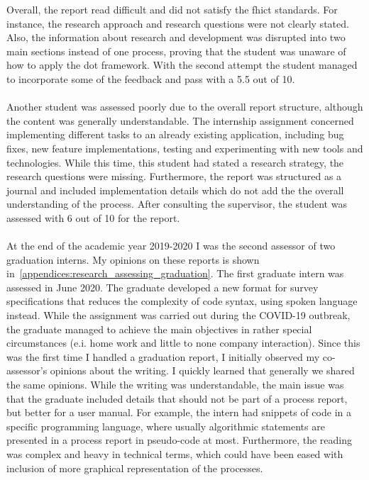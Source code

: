 Overall, the report read difficult and did not satisfy the \acrshort{fhict} standards. 
For instance, the research approach and research questions were not clearly stated. 
Also, the information about research and development was disrupted into two main sections instead of one process, proving that the student was unaware of how to apply the \acrshort{dot} framework. 
With the second attempt the student managed to incorporate some of the feedback and pass with a 5.5 out of 10. 
\\\\
Another student was assessed poorly due to the overall report structure, although the content was generally understandable.
The internship assignment concerned implementing different tasks to an already existing application, including bug fixes, new feature implementations, testing and experimenting with new tools and technologies.
While this time, this student had stated a research strategy, the research questions were missing. 
Furthermore, the report was structured as a journal and included implementation details which do not add the the overall understanding of the process. 
After consulting the supervisor, the student was assessed with 6 out of 10 for the report.
\\\\
At the end of the academic year 2019-2020 I was the second assessor of two graduation interns. My opinions on these reports is shown in~\cref{appendices:research_assessing_graduation}.
The first graduate intern was assessed in June 2020. 
The graduate developed a new format for survey specifications that reduces the complexity of code syntax, using spoken language instead. 
While the assignment was carried out during the COVID-19 outbreak, the graduate managed to achieve the main objectives in rather special circumstances (e.i. home work and little to none company interaction).
Since this was the first time I handled a graduation report, I initially observed my co-assessor's opinions about the writing.
I quickly learned that generally we shared the same opinions. 
While the writing was understandable, the main issue was that the graduate included details that should not be part of a process report, but better for a user manual. 
For example, the intern had snippets of code in a specific programming language, where usually algorithmic statements are presented in a process report in pseudo-code at most. 
Furthermore, the reading was complex and heavy in technical terms, which could have been eased with inclusion of more graphical representation of the processes. 
